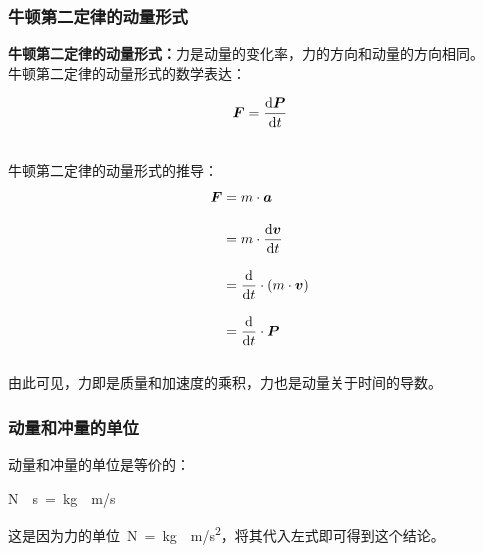 \documentclass[UTF8]{ctexart}
\newcommand*{\veb}[1]{\vb*{#1}}
\newcommand*{\dif}{\mathop{}\!\mathrm{d}}
\begin{document}
\subsubsection{牛顿第二定律的动量形式}
    \textbf{牛顿第二定律的动量形式：}力是动量的变化率，力的方向和动量的方向相同。\\[3mm]
    牛顿第二定律的动量形式的数学表达：
    \begin{large}
        \begin{equation*}
            \veb{F}=\frac{\dif \veb{P}}{\dif t}
        \end{equation*}
    \end{large}\\
    牛顿第二定律的动量形式的推导：
    \setcounter{equation}{0}
    \begin{align}
        \veb{F}
        &=m\cdot\veb{a}\\[3mm]
        &=m\cdot\frac{\dif\veb{v}}{\dif t}\\[3mm]
        &=\frac{\dif}{\dif t}\cdot(m\cdot\veb{v})\\[3mm]
        &=\frac{\dif}{\dif t}\cdot\veb{P}
    \end{align}\\
    由此可见，力即是质量和加速度的乘积，力也是动量关于时间的导数。

\newpage

\subsubsection{动量和冲量的单位}
    动量和冲量的单位是等价的：
    \begin{large}
        \begin{center}
            \si{N\cdot s}~=~\si{kg\cdot m/s}\\[6mm]
        \end{center}
    \end{large}
    这是因为力的单位~\si{N=kg\cdot m/s^2}，将其代入左式即可得到这个结论。\\
\end{document}
